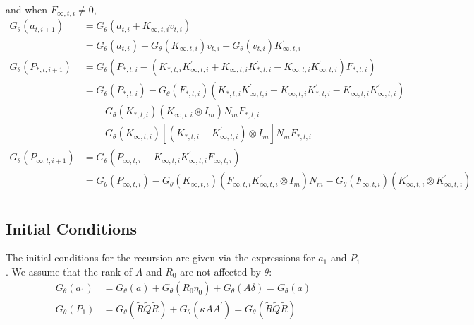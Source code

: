 \documentclass[12pt]{article}
\newcommand{\Gt}{G_\theta}
\begin{document}
	and when $F_{\infty,t,i} \neq 0$, 
	\begin{align*}
	\Gt(a_{t,i+1}) &= \Gt(a_{t,i} + K_{\infty,t,i} v_{t,i}) \\
	&= \Gt(a_{t,i}) + \Gt(K_{\infty,t,i})v_{t,i} + \Gt(v_{t,i}) K_{\infty,t,i}^\prime  \\
	\Gt(P_{*,t,i+1}) &= \Gt \left(P_{*,t,i} - (K_{*,t,i} K_{\infty,t,i}^\prime + K_{\infty,t,i} K_{*,t,i}^\prime - K_{\infty,t,i} K_{\infty,t,i}^\prime) F_{*,t,i} \right) \\
	&= \Gt(P_{*,t,i}) - \Gt (F_{*,t,i}) (K_{*,t,i} K_{\infty,t,i}^\prime + K_{\infty,t,i} K_{*,t,i}^\prime - K_{\infty,t,i} K_{\infty,t,i}^\prime) \\
	& \quad - \Gt(K_{*,t,i}) (K_{\infty,t,i} \otimes I_m) N_m F_{*,t,i}\\
	& \quad - \Gt(K_{\infty,t,i}) [(K_{*,t,i} - K_{\infty,t,i}^\prime) \otimes I_m] N_m F_{*,t,i}\\
	\Gt(P_{\infty,t,i+1}) &= \Gt(P_{\infty,t,i} - K_{\infty,t,i} K_{\infty,t,i}^\prime F_{\infty,t,i}) \\
	&= \Gt(P_{\infty,t,i}) - \Gt(K_{\infty,t,i})(F_{\infty,t,i} K_{\infty,t,i}^\prime \otimes I_m) N_m - \Gt(F_{\infty,t,i}) (K_{\infty,t,i}^\prime \otimes K_{\infty,t,i}^\prime) \\
	\end{align*}

\subsection{Initial Conditions}
	The initial conditions for the recursion are given via the expressions for $a_1$ and $P_1$. We assume that the rank of $A$ and $R_0$ are not affected by $\theta$: 
	\begin{align*}
	\Gt(a_1) &= \Gt(a) + \Gt(R_0 \eta_0) + \Gt(A \delta) = \Gt(a) \\
	\Gt(P_1) &= \Gt(\tilde{R} \tilde{Q} \tilde{R}) + \Gt(\kappa A A^\prime) = \Gt(\tilde{R} \tilde{Q} \tilde{R})\\
	\end{align*}
\end{document}

